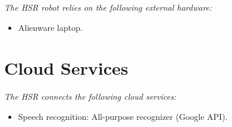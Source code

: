 \textit{The HSR robot relies on the following external hardware:}

\begin{itemize}
	\item Alienware laptop.
\end{itemize}

\section*{Cloud Services}

\textit{The HSR connects the following cloud services:}
\begin{itemize}
	\item Speech recognition: All-purpose recognizer (Google API).
\end{itemize}
